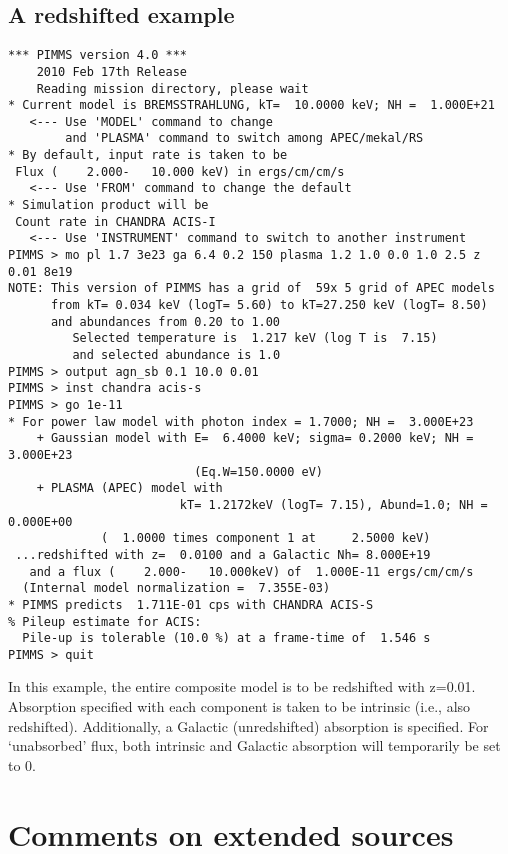 \subsection{A redshifted example}

\begin{verbatim}
*** PIMMS version 4.0 ***
    2010 Feb 17th Release
    Reading mission directory, please wait
* Current model is BREMSSTRAHLUNG, kT=  10.0000 keV; NH =  1.000E+21
   <--- Use 'MODEL' command to change
        and 'PLASMA' command to switch among APEC/mekal/RS
* By default, input rate is taken to be
 Flux (    2.000-   10.000 keV) in ergs/cm/cm/s
   <--- Use 'FROM' command to change the default
* Simulation product will be
 Count rate in CHANDRA ACIS-I
   <--- Use 'INSTRUMENT' command to switch to another instrument
PIMMS > mo pl 1.7 3e23 ga 6.4 0.2 150 plasma 1.2 1.0 0.0 1.0 2.5 z 0.01 8e19
NOTE: This version of PIMMS has a grid of  59x 5 grid of APEC models
      from kT= 0.034 keV (logT= 5.60) to kT=27.250 keV (logT= 8.50)
      and abundances from 0.20 to 1.00
         Selected temperature is  1.217 keV (log T is  7.15)
         and selected abundance is 1.0
PIMMS > output agn_sb 0.1 10.0 0.01
PIMMS > inst chandra acis-s
PIMMS > go 1e-11
* For power law model with photon index = 1.7000; NH =  3.000E+23
    + Gaussian model with E=  6.4000 keV; sigma= 0.2000 keV; NH =  3.000E+23
                          (Eq.W=150.0000 eV)
    + PLASMA (APEC) model with
                        kT= 1.2172keV (logT= 7.15), Abund=1.0; NH =  0.000E+00
             (  1.0000 times component 1 at     2.5000 keV)
 ...redshifted with z=  0.0100 and a Galactic Nh= 8.000E+19
   and a flux (    2.000-   10.000keV) of  1.000E-11 ergs/cm/cm/s
  (Internal model normalization =  7.355E-03)
* PIMMS predicts  1.711E-01 cps with CHANDRA ACIS-S
% Pileup estimate for ACIS:
  Pile-up is tolerable (10.0 %) at a frame-time of  1.546 s
PIMMS > quit
\end{verbatim}

In this example, the entire composite model is to be redshifted with z=0.01.
Absorption specified with each component is taken to be intrinsic (i.e.,
also redshifted).  Additionally, a Galactic (unredshifted) absorption is
specified.  For `unabsorbed' flux, both intrinsic and Galactic absorption
will temporarily be set to 0.

\section{Comments on extended sources}

